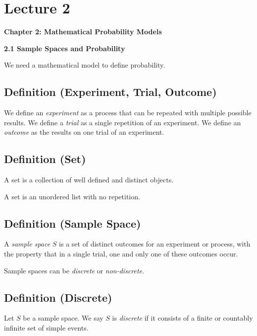 \section{Lecture 2}

\textbf{\textbf{Chapter 2: Mathematical Probability Models}}

\textbf{2.1 Sample Spaces and Probability}

We need a mathematical model to define probability.

\begin{defbox}
    \subsection{Definition (Experiment, Trial, Outcome)}
    We define an \emph{experiment} as a process that can be repeated with
    multiple possible results. We define a \emph{trial} as a single
    repetition of an experiment. We define an \emph{outcome} as
    the results on one trial of an experiment.
\end{defbox}

\begin{defbox}
    \subsection{Definition (Set)}
    A set is a collection of well defined and distinct objects.
\end{defbox}
\begin{remark}
    A set is an unordered list with no repetition.
\end{remark}

\begin{defbox}
    \subsection{Definition (Sample Space)}
    A \emph{sample space} $ S $ is a set of distinct outcomes for an experiment
    or process, with the property that in a single trial, one and only one of
    these outcomes occur.
\end{defbox}

Sample spaces can be \emph{discrete} or \emph{non-discrete}.
\begin{defbox}
    \subsection{Definition (Discrete)}
    Let $ S $ be a sample space. We say $ S $ is \emph{discrete} if it consists
    of a finite or countably infinite set of simple events.
\end{defbox}

